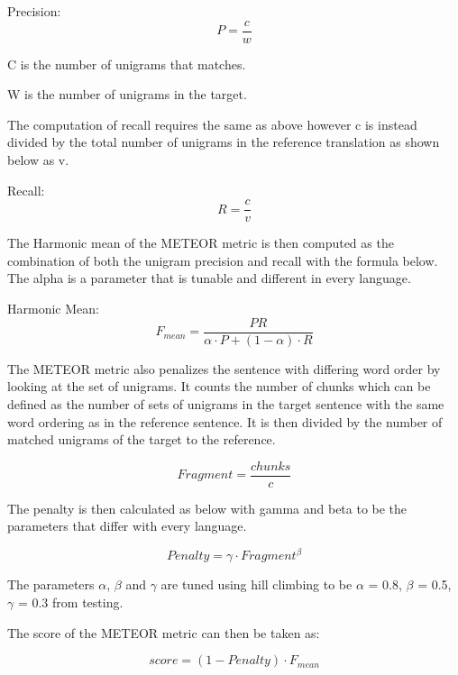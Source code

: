 \documentclass[11pt,letterpaper]{article}
\begin{document}
Precision:
\begin{equation*}
	P = \frac{c}{w}
\end{equation*}

C is the number of unigrams that matches.

W is the number of unigrams in the target.

The computation of recall requires the same as above however c is instead divided by the total number of unigrams in the reference translation as shown below as v.

Recall:
\begin{equation*}
	R = \frac{c}{v}
\end{equation*}

The Harmonic mean of the METEOR metric is then computed as the combination of both the unigram precision and recall with the formula below. The alpha is a parameter that is tunable and different in every language.

Harmonic Mean:
\begin{equation*}
	F_{mean} = \frac{PR}{\alpha \cdot P + (1-\alpha)\cdot R}
\end{equation*}

The METEOR metric also penalizes the sentence with differing word order by looking at the set of unigrams. It counts the number of chunks which can be defined as the number of sets of unigrams in the target sentence with the same word ordering as in the reference sentence. It is then divided by the number of matched unigrams of the target to the reference.

\begin{equation*}
	Fragment = \frac{chunks}{c}
\end{equation*}

The penalty is then calculated as below with gamma and beta to be the parameters that differ with every language.

\begin{equation*}
	Penalty = \gamma\cdot Fragment^{\beta}
\end{equation*}

The parameters \(\alpha\), \(\beta\) and \(\gamma\) are tuned using hill climbing to be \(\alpha\) = 0.8, \(\beta\) = 0.5, \(\gamma\) = 0.3 from testing.

The score of the METEOR metric can then be taken as:

\begin{equation*}
	score = (1-Penalty)\cdot F_{mean}
\end{equation*}
\end{document}
